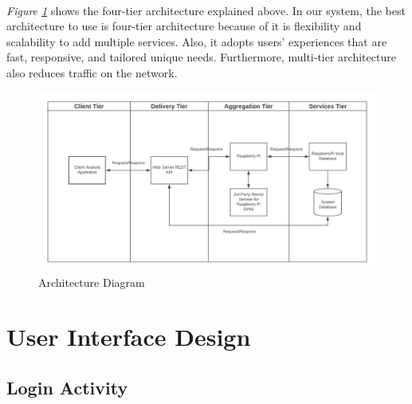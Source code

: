 \documentclass[12pt, oneside, a4paper]{book}
\begin{document}
		\paragraph{} \textit{Figure \ref{fig:diagram_architecture}} shows the four-tier architecture explained above. In our system, the best architecture to use is four-tier architecture because of it is flexibility and scalability to add multiple services. Also, it adopts users’ experiences that are fast, responsive, and tailored unique needs. Furthermore, multi-tier architecture also reduces traffic on the network\cite{architecture}.
		\begin{figure}[H]
			\centering
			\includegraphics[width=\linewidth]{img/diagram_architecture.png}
			\caption{Architecture Diagram}
			\label{fig:diagram_architecture}
		\end{figure}
		\newpage\section{User Interface Design}
		\subsection{Login Activity}
\end{document}
